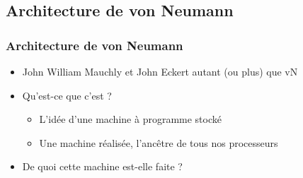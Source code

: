 \documentclass[xcolor=svgnames]{beamer}
\begin{document}
\subsection{Architecture de von Neumann}
\begin{frame}
  \frametitle{Architecture de von Neumann\nowrite}
  \begin{itemize}
  \item John William Mauchly et John Eckert autant (ou plus) que
    vN\pause
  \item Qu'est-ce que c'est ?\pause
    \begin{itemize}      
    \item L'idée d'une machine à \alert{programme
        stocké}\pause
    \item  Une machine réalisée, l'ancêtre de tous nos processeurs\pause
    \end{itemize}
  \item De quoi  cette machine est-elle faite ?\pause
  \begin{columns}[t]
  \begin{column}{4cm}
\centering
{}


\end{column}
\end{columns}
\end{itemize}
\end{frame}
\end{document}
